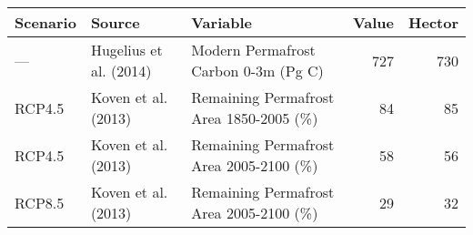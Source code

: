 \begin{tabular}{lllrr}
  \toprule
Scenario & Source & Variable & Value & Hector \\ 
  \midrule
--- & Hugelius et al. (2014) & Modern Permafrost Carbon 0-3m (Pg C) & 727 & 730 \\ 
  RCP4.5 & Koven et al. (2013) & Remaining Permafrost Area 1850-2005 (\%) & 84 & 85 \\ 
  RCP4.5 & Koven et al. (2013) & Remaining Permafrost Area 2005-2100 (\%) & 58 & 56 \\ 
  RCP8.5 & Koven et al. (2013) & Remaining Permafrost Area 2005-2100 (\%) & 29 & 32 \\ 
   \bottomrule
\end{tabular}
